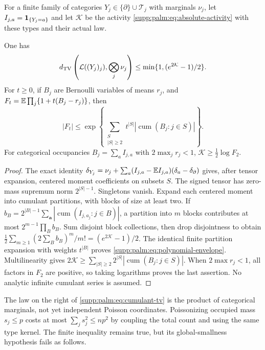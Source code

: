 For a finite family of categories $Y_j\in\{\partial\}\cup\mathcal T_j$ with marginals $\nu_j$, let $I_{j,a}=\mathbf 1_{\{Y_j=a\}}$ and let $\mathcal K$ be the activity \eqref{supp:palm:eq:absolute-activity} with these types and their actual law.
\begin{lemma}\label{supp:palm:lem:cumulant}
One has
\begin{equation}\label{supp:palm:eq:cumulant-tv}
 d_{\mathrm{TV}}\left(\mathcal L((Y_j)_j),\bigotimes_j\nu_j\right)
             \le\min\{1,(e^{2\mathcal K}-1)/2\}.
\end{equation}
For $t\ge0$, if $B_j$ are Bernoulli variables of means $r_j$, and
$F_t=\mathbb E\prod_j\{1+t(B_j-r_j)\}$, then
\begin{equation}\label{supp:palm:eq:polynomial-envelope}
 |F_t|\le\exp\!\left\{
   \sum_{\substack{S\\|S|\ge2}}t^{|S|}
                |\operatorname{cum}(B_j:j\in S)|\right\}.
\end{equation}
For categorical occupancies $B_j=\sum_a I_{j,a}$ with $2\max_jr_j<1$,
$\mathcal K\ge\tfrac12\log F_2$.
\end{lemma}
\begin{proof}
The exact identity
$\delta_{Y_j}=\nu_j+\sum_a(I_{j,a}-\mathbb E I_{j,a})(\delta_a-\delta_\partial)$
gives, after tensor expansion, centered moment coefficients on subsets $S$.
The signed tensor has zero-mass supremum norm $2^{|S|-1}$. Singletons vanish.
Expand each centered moment into cumulant partitions, with blocks of size at least two. If
$b_B=2^{|B|-1}\sum_{\boldsymbol a}|\operatorname{cum}(I_{j,a_j}:j\in B)|$,
a partition into $m$ blocks contributes at most
$2^{m-1}\prod_B b_B$. Sum disjoint block collections, then drop disjointness to obtain
$\frac12\sum_{m\ge1}(2\sum_B b_B)^m/m!=(e^{2\mathcal K}-1)/2$.
The identical finite partition expansion with weights $t^{|B|}$ proves
\eqref{supp:palm:eq:polynomial-envelope}. Multilinearity gives
$2\mathcal K\ge\sum_{|S|\ge2}2^{|S|}|\operatorname{cum}(B_j:j\in S)|$.
When $2\max r_j<1$, all factors in $F_2$ are positive, so taking logarithms proves the last assertion. No analytic infinite cumulant series is assumed.
\end{proof}
The law on the right of \eqref{supp:palm:eq:cumulant-tv} is the product of categorical marginals, not yet independent Poisson coordinates. Poissonizing occupied mass $s_j\le p$ costs at most $\sum_js_j^2\le np^2$ by coupling the total count and using the same type kernel. The finite inequality remains true, but its global-smallness hypothesis fails as follows.

